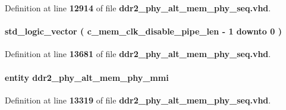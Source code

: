 Definition at line {\bf 12914} of file {\bf ddr2\+\_\+phy\+\_\+alt\+\_\+mem\+\_\+phy\+\_\+seq.\+vhd}.

\paragraph[{mem\+\_\+clk\+\_\+disable}]{ {\bfseries \textcolor{comment}{std\+\_\+logic\+\_\+vector}\textcolor{vhdlchar}{ }\textcolor{vhdlchar}{(}\textcolor{vhdlchar}{ }\textcolor{vhdlchar}{ }\textcolor{vhdlchar}{ }\textcolor{vhdlchar}{ }{\bfseries {\bf c\+\_\+mem\+\_\+clk\+\_\+disable\+\_\+pipe\+\_\+len}} \textcolor{vhdlchar}{-\/}\textcolor{vhdlchar}{ } \textcolor{vhdldigit}{1} \textcolor{vhdlchar}{ }\textcolor{keywordflow}{downto}\textcolor{vhdlchar}{ }\textcolor{vhdlchar}{ } \textcolor{vhdldigit}{0} \textcolor{vhdlchar}{ }\textcolor{vhdlchar}{)}\textcolor{vhdlchar}{ }} \hspace{0.3cm}{\ttfamily [Signal]}}\label{classddr2__phy__alt__mem__phy__seq_1_1struct_ad6eaeeda02241df49894921ce8521f34}


Definition at line {\bf 13681} of file {\bf ddr2\+\_\+phy\+\_\+alt\+\_\+mem\+\_\+phy\+\_\+seq.\+vhd}.

\paragraph[{mmi}]{ {\bfseries \textcolor{keywordflow}{entity}\textcolor{vhdlchar}{ }\textcolor{vhdlchar}{ddr2\+\_\+phy\+\_\+alt\+\_\+mem\+\_\+phy\+\_\+mmi}\textcolor{vhdlchar}{ }} \hspace{0.3cm}{\ttfamily [Instantiation]}}\label{classddr2__phy__alt__mem__phy__seq_1_1struct_ae2654f23608fef3ec6506762d7d257dd}


Definition at line {\bf 13319} of file {\bf ddr2\+\_\+phy\+\_\+alt\+\_\+mem\+\_\+phy\+\_\+seq.\+vhd}.

